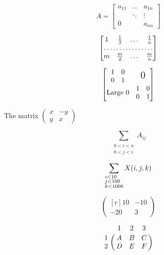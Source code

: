 \documentclass{article}
\begin{document}
        \[
            A = \begin{bmatrix} 
            a_{11} & \dots & a_{1n} \\
            & \ddots & \vdots \\
            0 &  & a_{nn}
            \end{bmatrix}    
        \]

        \[
            \begin{bmatrix}
            1 & \frac 12 & \dots & \frac 1n \\
            \hdotsfor{4} \\
            m & \frac m2 & \dots & \frac mn
            \end{bmatrix}
        \]

        \[
            \begin{bmatrix}
            \begin{matrix} 1 & 0 \\ 
                        0 & 1 \end{matrix}
            & \text{\Large 0} \\
            \text{Large 0} & \begin{matrix}
                            1 & 0 \\
                            0 & 1 \end{matrix}
            \end{bmatrix}
        \]

        The matrix \begin{math}
        \left( \begin{smallmatrix}
        x & -y \\
        y & x \end{smallmatrix} \right) \end{math}

        \[
            \sum_{\substack{0<i<n \\ 0<j<i}} A_{ij}    
        \]

        \[
            \sum_{\begin{subarray}{l}   %
            i<10 \\ j<100 \\ k<1000
            \end{subarray}} X(i,j,k)    
        \]

        \[
            \begin{pmatrix*}[r]
            10 & -10 \\ -20 & 3
            \end{pmatrix*}    
        \]

        \[
            \bordermatrix{
                & 1 & 2 & 3 \cr
            1 & A & B & C \cr
            2 & D & E & F \cr
            }    
        \]
                    
\end{document}

